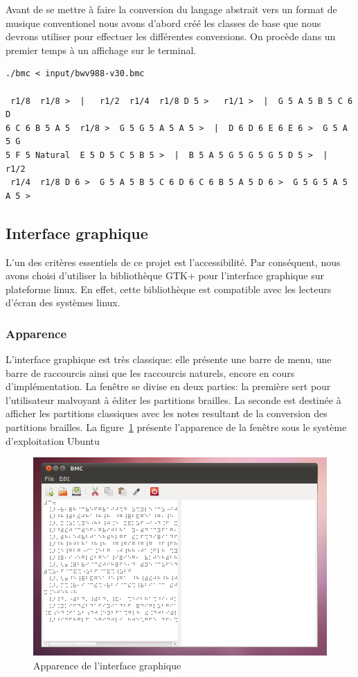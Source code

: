 Avant de se mettre à faire la conversion du langage abstrait vers un format de musique conventionel nous avons d'abord créé les classes de base que nous devrons utiliser pour effectuer les différentes conversions. On procède dans un premier temps à un affichage sur le terminal.

\begin{verbatim}
./bmc < input/bwv988-v30.bmc 

 r1/8  r1/8 >  |   r1/2  r1/4  r1/8 D 5 >   r1/1 >  |  G 5 A 5 B 5 C 6 D 
6 C 6 B 5 A 5  r1/8 >  G 5 G 5 A 5 A 5 >  |  D 6 D 6 E 6 E 6 >  G 5 A 5 G 
5 F 5 Natural  E 5 D 5 C 5 B 5 >  |  B 5 A 5 G 5 G 5 G 5 D 5 >  |   r1/2 
 r1/4  r1/8 D 6 >  G 5 A 5 B 5 C 6 D 6 C 6 B 5 A 5 D 6 >  G 5 G 5 A 5 A 5 > 
\end{verbatim}

\subsection{Interface graphique}

L'un des critères essentiels de ce projet est l'accessibilité. Par
conséquent, nous avons choisi d'utiliser la bibliothèque GTK+ pour
l'interface graphique sur plateforme linux. En effet, cette
bibliothèque est compatible avec les lecteurs d'écran des systèmes
linux.


\subsubsection*{Apparence}
L'interface graphique est très classique: elle présente une barre de
menu, une barre de raccourcis ainsi que les raccourcis naturels,
encore en cours d'implémentation. La fenêtre se divise en deux
parties: la première sert pour l'utilisateur malvoyant à éditer les
partitions brailles. La seconde est destinée à afficher les partitions
classiques avec les notes resultant de la conversion des partitions
brailles.  La figure~\ref{interface} présente l'apparence de la fenêtre sous le
système d'exploitation Ubuntu

\begin{center}
\begin{figure}[hbtp]
  \includegraphics[width=1\textwidth]{images/linux_gui.png}
  \caption{Apparence de l'interface graphique}
  \label{interface}
\end{figure}
\end{center}

